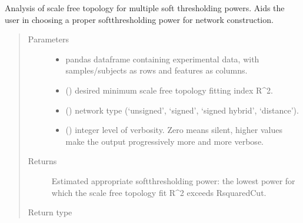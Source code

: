 \documentclass[letterpaper,10pt,english]{sphinxmanual}
\begin{document}

\begin{fulllineitems}
\label{\detokenize{_autosummary/analytics_core.analytics:analytics_core.analytics.wgcnaAnalysis.pick_softThreshold}}
Analysis of scale free topology for multiple soft thresholding powers. Aids the user in choosing a proper soft\sphinxhyphen{}thresholding power for network construction.
\begin{quote}\begin{description}
\item[{Parameters}] \leavevmode\begin{itemize}
\item {} 
 \textendash{} pandas dataframe containing experimental data, with samples/subjects as rows and features as columns.

\item {} 
 () \textendash{} desired minimum scale free topology fitting index R\textasciicircum{}2.

\item {} 
 () \textendash{} network type (‘unsigned’, ‘signed’, ‘signed hybrid’, ‘distance’).

\item {} 
 () \textendash{} integer level of verbosity. Zero means silent, higher values make the output progressively more and more verbose.

\end{itemize}

\item[{Returns}] \leavevmode
Estimated appropriate soft\sphinxhyphen{}thresholding power: the lowest power for which the scale free topology fit R\textasciicircum{}2 exceeds RsquaredCut.

\item[{Return type}] \leavevmode
{}

\end{description}\end{quote}

\end{fulllineitems}
\end{document}
